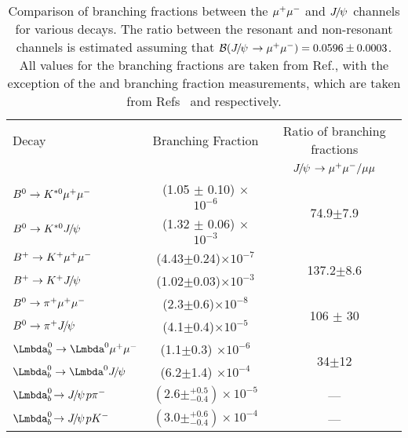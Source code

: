 \begin{table}

  \centering
  \begin{tabular}{l|c|c}
    \hline
    Decay& Branching Fraction & Ratio of branching fractions\\
    &&     ${{J\mkern -3mu/\mkern -2mu\psi\mkern 2mu}}\rightarrow{\ensuremath{\mu^+\mu^-}}/\mu\mu$\\
    \hline
    ${{B}^0}\rightarrow{\ensuremath{{K}^{*0}}} {\ensuremath{\mu^+}}{\ensuremath{\mu^-}}$ & (1.05 $\pm$ 0.10) $\times$ $10^{-6}$ & \multirow{2}{*}{74.9$\pm$7.9}\\
    ${{B}^0}\rightarrow{\ensuremath{{K}^{*0}}} {\ensuremath{{J\mkern -3mu/\mkern -2mu\psi\mkern 2mu}}}$ & (1.32 $\pm$ 0.06) $\times$ $10^{-3}$ &\\
    \hline
    ${{B}^+}\rightarrow{\ensuremath{{K}^+}} {\ensuremath{\mu^+}}{\ensuremath{\mu^-}}$ & (4.43$\pm$0.24)$\times 10^{-7}$ & \multirow{2}{*}{137.2$\pm$8.6}\\
    ${{B}^+}\rightarrow{\ensuremath{{K}^+}} {\ensuremath{{J\mkern -3mu/\mkern -2mu\psi\mkern 2mu}}}$ & (1.02$\pm$0.03)$\times 10^{-3}$ & \\
    \hline
    ${{B}^0}\rightarrow{\ensuremath{{\pi}^+}}{\ensuremath{\mu^+}}{\ensuremath{\mu^-}}$ & (2.3$\pm$0.6)$\times 10^{-8}$ &  \multirow{2}{*}{106 $\pm$ 30}\\
    ${{B}^0}\rightarrow{\ensuremath{{\pi}^+}}{\ensuremath{{J\mkern -3mu/\mkern -2mu\psi\mkern 2mu}}}$ & (4.1$\pm$0.4)$\times 10^{-5}$ &\\
    \hline
    $\Lb\to\Lz\mup\mun$ & (1.1$\pm$0.3) $\times 10^{-6}$& \multirow{2}{*}{34$\pm$12}\\
    $\Lb\to\Lz\jpsi$ & (6.2$\pm$1.4) $\times 10^{-4}$&\\
    \hline
    $\Lbpijpsi$ & $(2.6\pm^{+0.5}_{-0.4}) \times 10^{-5}$& ---\\
    \hline
    $\LbKjpsi$ & $(3.0\pm^{+0.6}_{-0.4}) \times 10^{-4}$& ---\\
    \hline
    
  \end{tabular}
  \caption{Comparison of branching fractions between the ${\mu^+\mu^-}$ and ${{J\mkern -3mu/\mkern -2mu\psi\mkern 2mu}}$ channels for various decays. The ratio between the resonant and non-resonant channels is estimated assuming that ${\cal B}({{J\mkern -3mu/\mkern -2mu\psi\mkern 2mu}}\rightarrow{\ensuremath{\mu^+\mu^-}}) = 0.0596 \pm 0.0003$. All values for the branching fractions are taken from Ref.\cite{pdg}, with the exception of the \Lbpijpsi and \LbKjpsi branching fraction measurements, which are taken from Refs~\cite{LHCb-PAPER-2014-020} and \cite{LbKjpsi} respectively.}
  \label{tab:bfcomp}
  
\end{table}

\cleardoublepage
